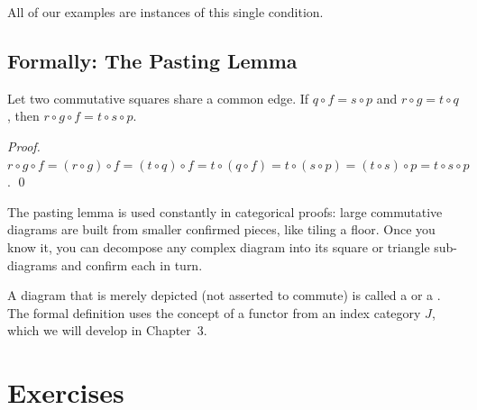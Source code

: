 All of our examples are instances of this single condition.

\subsection{Formally: The Pasting Lemma}

Let two commutative squares share a common edge. If
$q \circ f = s \circ p$ and $r \circ g = t \circ q$, then
$r \circ g \circ f = t \circ s \circ p$.

\emph{Proof.} $r \circ g \circ f = (r \circ g) \circ f = (t \circ q) \circ f
= t \circ (q \circ f) = t \circ (s \circ p) = (t \circ s) \circ p =
t \circ s \circ p$. \qed

The pasting lemma is used constantly in categorical proofs: large commutative
diagrams are built from smaller confirmed pieces, like tiling a floor. Once
you know it, you can decompose any complex diagram into its square or triangle
sub-diagrams and confirm each in turn.

A diagram that is merely depicted (not asserted to commute) is called a
 or a .
The formal definition uses the concept of a functor from an index category $J$,
which we will develop in Chapter~3.


\section*{Exercises}

